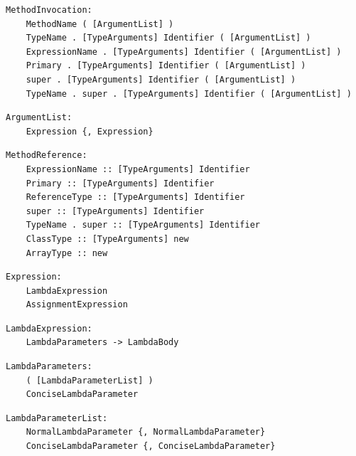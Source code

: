\noindent\textbf{\texttt{}}\par
\begin{lstlisting}
MethodInvocation:
    MethodName ( [ArgumentList] )
    TypeName . [TypeArguments] Identifier ( [ArgumentList] )
    ExpressionName . [TypeArguments] Identifier ( [ArgumentList] )
    Primary . [TypeArguments] Identifier ( [ArgumentList] )
    super . [TypeArguments] Identifier ( [ArgumentList] )
    TypeName . super . [TypeArguments] Identifier ( [ArgumentList] )
\end{lstlisting}

\noindent\textbf{\texttt{}}\par
\begin{lstlisting}
ArgumentList:
    Expression {, Expression}
\end{lstlisting}

\noindent\textbf{\texttt{}}\par
\begin{lstlisting}
MethodReference:
    ExpressionName :: [TypeArguments] Identifier
    Primary :: [TypeArguments] Identifier
    ReferenceType :: [TypeArguments] Identifier
    super :: [TypeArguments] Identifier
    TypeName . super :: [TypeArguments] Identifier
    ClassType :: [TypeArguments] new
    ArrayType :: new
\end{lstlisting}

\noindent\textbf{\texttt{}}\par
\begin{lstlisting}
Expression:
    LambdaExpression
    AssignmentExpression
\end{lstlisting}

\noindent\textbf{\texttt{}}\par
\begin{lstlisting}
LambdaExpression:
    LambdaParameters -> LambdaBody
\end{lstlisting}

\noindent\textbf{\texttt{}}\par
\begin{lstlisting}
LambdaParameters:
    ( [LambdaParameterList] )
    ConciseLambdaParameter
\end{lstlisting}

\noindent\textbf{\texttt{}}\par
\begin{lstlisting}
LambdaParameterList:
    NormalLambdaParameter {, NormalLambdaParameter}
    ConciseLambdaParameter {, ConciseLambdaParameter}
\end{lstlisting}

